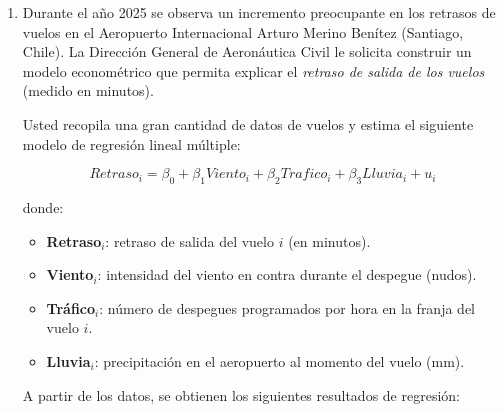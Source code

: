 \documentclass[10pt,a4paper]{article}
\begin{document}
\begin{enumerate}
    \item Durante el año 2025 se observa un incremento preocupante en los retrasos de vuelos en el Aeropuerto Internacional Arturo Merino Benítez (Santiago, Chile). La Dirección General de Aeronáutica Civil le solicita construir un modelo econométrico que permita explicar el \textit{retraso de salida de los vuelos} (medido en minutos).

Usted recopila una gran cantidad de datos de vuelos y estima el siguiente modelo de regresión lineal múltiple:

\[
Retraso_i = \beta_0 + \beta_1 Viento_i + \beta_2 Trafico_i + \beta_3 Lluvia_i + u_i
\]

donde:

\begin{itemize}
    \item \textbf{Retraso$_i$}: retraso de salida del vuelo $i$ (en minutos).
    \item \textbf{Viento$_i$}: intensidad del viento en contra durante el despegue (nudos).
    \item \textbf{Tráfico$_i$}: número de despegues programados por hora en la franja del vuelo $i$.
    \item \textbf{Lluvia$_i$}: precipitación en el aeropuerto al momento del vuelo (mm).
\end{itemize}

A partir de los datos, se obtienen los siguientes resultados de regresión:


\end{enumerate}
\end{document}
